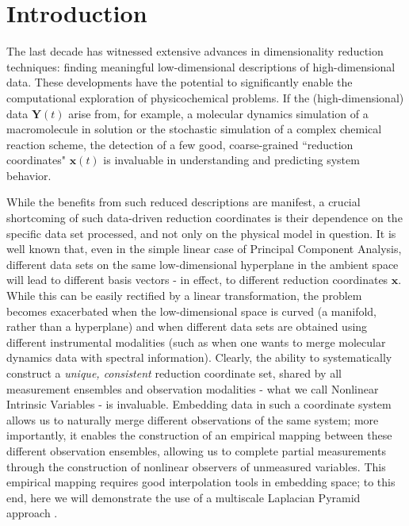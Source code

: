 \documentclass[aip,jcp,preprint]{revtex4-1}
\begin{document}

\maketitle

\section{Introduction}
The last decade has witnessed extensive advances in dimensionality reduction techniques:
finding meaningful low-dimensional descriptions of high-dimensional data.
%
These developments have the potential to significantly enable the computational exploration
of physicochemical problems.
%
If the (high-dimensional) data $\mathbf{Y}(t)$ arise from, for example, a
molecular dynamics simulation of a macromolecule in solution or the stochastic
simulation of a complex chemical reaction scheme, the detection of a few good, coarse-grained
``reduction coordinates" $\mathbf{x}(t)$ is invaluable in understanding and predicting system behavior.

%
While the benefits from such reduced descriptions are manifest, a crucial shortcoming of
such data-driven reduction coordinates is their dependence on the specific data set processed,
and not only on the physical model in question.
%
It is well known that, even in the simple linear case of Principal Component Analysis,
different data sets on the same low-dimensional hyperplane in the ambient space
will lead to different basis vectors - in effect, to different reduction coordinates $\mathbf{x}$.
%
While this can be easily rectified by a linear transformation, the problem becomes
exacerbated when the low-dimensional space is curved (a manifold, rather than a hyperplane)
and when different data sets are obtained using different instrumental modalities
(such as when one wants to merge molecular dynamics data with spectral information).
%
Clearly, the ability to systematically construct a {\em unique, consistent} reduction
coordinate set, shared by all measurement ensembles and observation modalities -
what we call Nonlinear Intrinsic Variables - is invaluable.
%
Embedding data in such a coordinate system allows us to naturally merge different observations of the same system;
more importantly, it enables the construction of an empirical mapping between these different
observation ensembles, allowing us to complete partial measurements through the construction
of nonlinear observers of unmeasured variables.
%
This empirical mapping requires good interpolation tools in embedding space; to this
end, here we will demonstrate the use of a multiscale Laplacian Pyramid approach \cite{rabin2012heterogeneous}.
\end{document}
